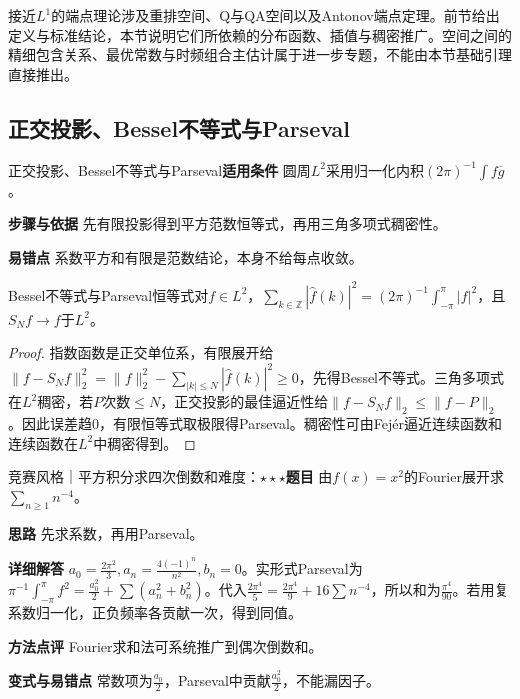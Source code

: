 \begin{warning}接近$L^1$的端点理论涉及重排空间、Q与QA空间以及Antonov端点定理。前节给出定义与标准结论，本节说明它们所依赖的分布函数、插值与稠密推广。空间之间的精细包含关系、最优常数与时频组合主估计属于进一步专题，不能由本节基础引理直接推出。\end{warning}

\subsection{正交投影、Bessel不等式与Parseval}\label{deep:fourier_source_deep:parseval}

\begin{method}{正交投影、Bessel不等式与Parseval}\textbf{适用条件} 圆周$L^2$采用归一化内积$(2\pi)^{-1}\int f\overline g$。\par\textbf{步骤与依据} 先有限投影得到平方范数恒等式，再用三角多项式稠密性。\par\textbf{易错点} 系数平方和有限是范数结论，本身不给每点收敛。\end{method}

\begin{theorem}{Bessel不等式与Parseval恒等式}对$f\in L^2$，$\sum_{k\in\mathbb Z}|\widehat f(k)|^2=(2\pi)^{-1}\int_{-\pi}^{\pi}|f|^2$，且$S_Nf\to f$于$L^2$。\end{theorem}\begin{proof}指数函数是正交单位系，有限展开给$\|f-S_Nf\|_2^2=\|f\|_2^2-\sum_{|k|\le N}|\widehat f(k)|^2\ge0$，先得Bessel不等式。三角多项式在$L^2$稠密，若$P$次数$\le N$，正交投影的最佳逼近性给$\|f-S_Nf\|_2\le\|f-P\|_2$。因此误差趋0，有限恒等式取极限得Parseval。稠密性可由Fejér逼近连续函数和连续函数在$L^2$中稠密得到。\end{proof}

\begin{example}{竞赛风格｜平方积分求四次倒数和}{难度：$\star\star\star$}\label{deep:ex:fourier_source_deep:baselparseval}\textbf{题目} 由$f(x)=x^2$的Fourier展开求$\sum_{n\ge1}n^{-4}$。\par\textbf{思路} 先求系数，再用Parseval。\par\textbf{详细解答} $a_0=\frac{2\pi^2}{3},a_n=\frac{4(-1)^n}{n^2},b_n=0$。实形式Parseval为$\pi^{-1}\int_{-\pi}^{\pi}f^2=\frac{a_0^2}{2}+\sum(a_n^2+b_n^2)$。代入$\frac{2\pi^4}{5}=\frac{2\pi^4}{9}+16\sum n^{-4}$，所以和为$\frac{\pi^4}{90}$。若用复系数归一化，正负频率各贡献一次，得到同值。\par\textbf{方法点评} Fourier求和法可系统推广到偶次倒数和。\par\textbf{变式与易错点} 常数项为$\frac{a_0}{2}$，Parseval中贡献$\frac{a_0^2}{2}$，不能漏因子。\end{example}

